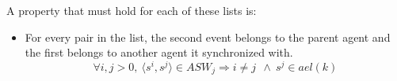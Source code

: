         A property that must hold for each of these lists is: 
        \begin{itemize} 
            \item For every pair in the list, the second event belongs to the parent agent and the first belongs to another agent it synchronized with.
                \[  
                    \forall{i,j>0},\ 
                    \langle s^i, s^j\rangle \in ASW_j 
                    \Rightarrow{} 
                    i \neq j\ \ \wedge \
                    s^j \in ael(k)                        
                \]
        \end{itemize}
        
